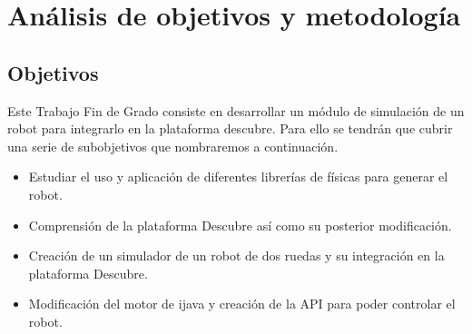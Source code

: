 








\chapter{Análisis de objetivos y metodología}\label{objetivos-metodologia}

\section{Objetivos}
\label{sec:Objetivos}

Este Trabajo Fin de Grado consiste en desarrollar un módulo de simulación de un robot para integrarlo en la plataforma \Gls{descubre}. Para ello se tendrán que cubrir una serie de subobjetivos que nombraremos a continuación.
\begin{itemize}
\item Estudiar el uso y aplicación de diferentes librerías de físicas para generar el robot.
\item Comprensión de la plataforma Descubre así como su posterior modificación.
\item Creación de un simulador de un robot de dos ruedas y su integración en la plataforma Descubre.
\item Modificación del motor de \gls{ijava} y creación de la \acrshort{API} para poder controlar el robot.
\end{itemize}

